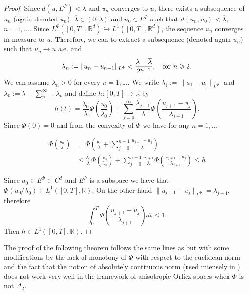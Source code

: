 \documentclass[twoside]{article}
\theoremstyle{remark}
\newcommand{\orlnor}{\|_{L^{\Phi}}}
\newcommand{\lphi}{L^{\Phi}}
\newcommand{\ephi}{E^{\Phi}}
\newcommand{\claseor}{C^{\Phi}}
\newcommand{\rr}{\mathbb{R}}
\renewcommand{\leq}{\leqslant}
\renewcommand{\geq}{\geqslant}
\begin{document}
\begin{proof}
  Since $d({u},\ephi)<\lambda$ and ${u}_n$ converges to ${u}$, there exists   a subsequence of $u_n$ (again denoted $u_n$), $\overline{\lambda}\in (0,\lambda)$ and $u_0\in\ephi$ such that $d(u_n,u_0)<\overline{\lambda}$, $n=1,\ldots$. Since $\lphi\left([0,T],\rr^d\right)\hookrightarrow L^1\left([0,T],\rr^d\right)$, the sequence $u_n$ converges in measure to $u$. Therefore, we can to extract a subsequence (denoted again $u_n$) such that $u_n\to u$ a.e. and
  \[\lambda_{n}:=\|{u}_{n}-{u}_{n-1}\orlnor<\frac{\lambda-\overline{\lambda}}{2^{n-1}},\quad\hbox{for } n\geq 2.\]
 We can assume $\lambda_n>0$ for every $n=1,\ldots$. We write $\lambda_1:=\|u_1-u_0\orlnor$ and  $\lambda_0:=\lambda-\sum_{n=1}^{\infty}\lambda_n$ and define $h:[0,T]\rightarrow\mathbb{R}$  by
 \begin{equation}\label{eq:serie} h(t)=  \frac{\lambda_0}{\lambda}\Phi\left(\frac{u_0}{\lambda_0}\right)+\sum_{j=0}^{\infty}\frac{\lambda_{j+1}}{\lambda}\Phi\left(\frac{u_{j+1}-u_j}{\lambda_{j+1}}\right).
\end{equation}
 Since $\Phi(0)=0$ and from the convexity of $\Phi$ we have for any $n=1,\ldots$


\[
 \begin{split}
   \Phi\left(\frac{u_n}{\lambda}\right) &=\Phi\left(  \frac{u_0}{\lambda}+   \sum_{j=0}^{n-1}\frac{u_{j+1}-u_j}{\lambda} \right)\\
   &\leq
   \frac{\lambda_0}{\lambda}\Phi\left(\frac{u_0}{\lambda_0}\right)+\sum_{j=0}^{n-1}\frac{\lambda_{j+1}}{\lambda}\Phi\left(\frac{u_{j+1}-u_j}{\lambda_{j+1}}\right) \leq h
 \end{split}
\]

Since $u_0\in\ephi\subset \claseor$ and $\ephi$ is a subspace we have that $\Phi(u_0/\lambda_0)\in L^1([0,T],\rr)$.
On the other hand $\|u_{j+1}-u_j\orlnor = \lambda_{j+1}$, therefore
\[
\int_0^T\Phi\left(\frac{u_{j+1}-u_j}{\lambda_{j+1}}\right)dt\leq 1.
\]
Then $h\in L^1([0,T],\rr)$.



\end{proof}





The  proof of the following theorem follows the same lines as \cite[Th. 3.2]{ABGMS2015} but with some modifications by the lack of monotony of $\Phi$ with  respect to the euclidean norm and the fact that  the notion of absolutely continuous norm (used intensely in \cite[Th. 3.2]{ABGMS2015}) does not work very well in the framework of anisotropic Orlicz spaces when $\Phi$ is not $\Delta_2$.
\end{document}
